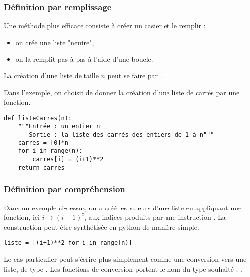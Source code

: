 \subsubsection{Définition par remplissage}
Une méthode plus efficace consiste à créer un casier et le remplir :
\begin{itemize}
  \item on crée une liste "neutre",
  \item on la remplit pas-à-pas à l'aide d'une boucle.
\end{itemize}
La création d'une liste de taille $n$ peut se faire par .

Dans l'exemple, on choisit de donner la création d'une liste de carrés par une fonction.
\begin{lstlisting}
def listeCarres(n):
    """Entrée : un entier n
       Sortie : la liste des carrés des entiers de 1 à n"""
    carres = [0]*n
    for i in range(n):
        carres[i] = (i+1)**2
    return carres
\end{lstlisting}
\subsubsection{Définition par compréhension}
Dans un exemple ci-dessus, on a créé les valeurs d'une liste en appliquant une fonction, ici $i \mapsto (i+1)^2$, aux indices produits par une instruction . La construction peut être synthétisée en python de manière simple.
\begin{lstlisting}
liste = [(i+1)**2 for i in range(n)]
\end{lstlisting}
Le cas particulier  peut s'écrire plus simplement comme une conversion vers une liste, de type . Les fonctions de conversion portent le nom du type souhaité : .
